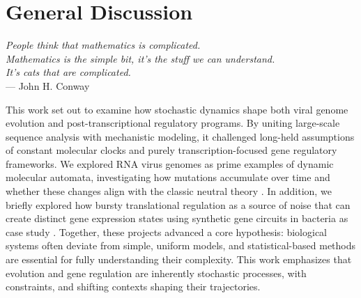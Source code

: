 \chapter{General Discussion}

\begin{flushright}
    \textit{People think that mathematics is complicated.\\Mathematics is the simple bit, it's the stuff we can understand.\\It's cats that are complicated.}\\
    --- John H. Conway
\end{flushright}

\vspace{1cm}

This work set out to examine how stochastic dynamics shape both viral genome evolution and post-transcriptional regulatory programs. By uniting large-scale sequence analysis with mechanistic modeling, it challenged long-held assumptions of constant molecular clocks and purely transcription-focused gene regulatory frameworks. We explored RNA virus genomes as prime examples of dynamic molecular automata, investigating how mutations accumulate over time and whether these changes align with the classic neutral theory \cite{kimura1968,Zuckerkandl1965}. In addition, we briefly explored how bursty translational regulation as a source of noise that can create distinct gene expression states using synthetic gene circuits in bacteria as case study \cite{Elowitz2002,Dolcemascolo2022}. Together, these projects advanced a core hypothesis: biological systems often deviate from simple, uniform models, and statistical-based methods are essential for fully understanding their complexity. This work emphasizes that evolution and gene regulation are inherently stochastic processes, with constraints, and shifting contexts shaping their trajectories.

